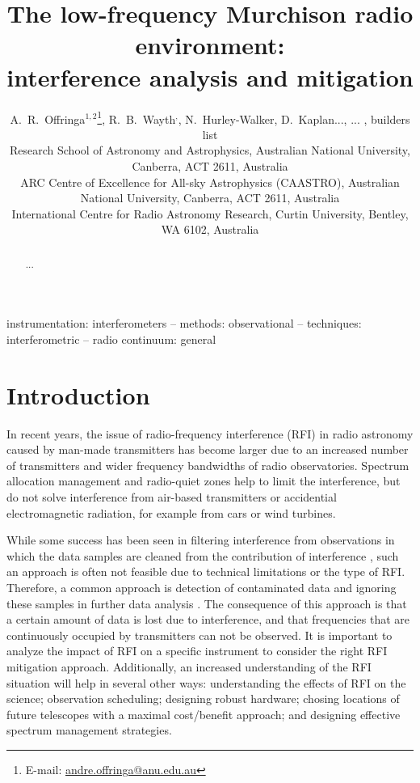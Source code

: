 \documentclass{pasa}
\title[The Murchison radio environment]{The low-frequency Murchison radio environment:\\interference analysis and mitigation}
\author[A.~R.~Offringa et al.]{A.~R.~Offringa$^{1,2}$\thanks{\editmark{Corresponding author.} E-mail: \url{andre.offringa@anu.edu.au}},
R.~B.~Wayth\Curtin$^,$\CAASTRO,
N.~Hurley-Walker\Curtin,
D.~Kaplan...,
... , %
builders list
\\
\ANU{}Research School of Astronomy and Astrophysics, Australian National University, Canberra, ACT 2611, Australia \\
\CAASTRO{}ARC Centre of Excellence for All-sky Astrophysics (CAASTRO), Australian National University, Canberra, ACT 2611, Australia \\
\Curtin{}International Centre for Radio Astronomy Research, Curtin University, Bentley, WA 6102, Australia\\
}
\begin{document}
\maketitle


\label{firstpage}

\begin{abstract}
...
\end{abstract}

\begin{keywords}
instrumentation: interferometers -- methods: observational -- techniques: interferometric -- radio continuum: general
\end{keywords}

\section{Introduction}
In recent years, the issue of radio-frequency interference (RFI) in radio astronomy caused by man-made transmitters has become larger due to an increased number of transmitters and wider frequency bandwidths of radio observatories. Spectrum allocation management and radio-quiet zones help to limit the interference, but do not solve interference from air-based transmitters or accidential electromagnetic radiation, for example from cars or wind turbines.

While some success has been seen in filtering interference from observations in which the data samples are cleaned from the contribution of interference \citep{spatial-filtering-parkes-multibeam-for-pulses,rfi-spatial-processing-hellbourg-2014}, such an approach is often not feasible due to technical limitations or the type of RFI. Therefore, a common approach is detection of contaminated data and ignoring these samples in further data analysis \citep{post-correlation-rfi-classification}. The consequence of this approach is that a certain amount of data is lost due to interference, and that frequencies that are continuously occupied by transmitters can not be observed. It is important to analyze the impact of RFI on a specific instrument to consider the right RFI mitigation approach. Additionally, an increased understanding of the RFI situation will help in several other ways: understanding the effects of RFI on the science; observation scheduling; designing robust hardware; chosing locations of future telescopes with a maximal cost/benefit approach; and designing effective spectrum management strategies.
\end{document}
